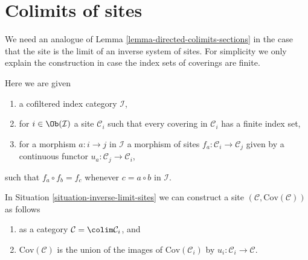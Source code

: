 \section{Colimits of sites}
\label{section-colimit-sites}

\noindent
We need an analogue of Lemma \ref{lemma-directed-colimits-sections}
in the case that the site
is the limit of an inverse system of sites. For simplicity we only
explain the construction in case the index sets of coverings are finite.

\begin{situation}
\label{situation-inverse-limit-sites}
Here we are given
\begin{enumerate}
\item a cofiltered index category $\mathcal{I}$,
\item for $i \in \Ob(\mathcal{I})$ a site $\mathcal{C}_i$ such that every
covering in $\mathcal{C}_i$ has a finite index set,
\item for a morphism $a : i \to j$ in $\mathcal{I}$ a morphism of sites
$f_a : \mathcal{C}_i \to \mathcal{C}_j$ given by a continuous functor
$u_a : \mathcal{C}_j \to \mathcal{C}_i$,
\end{enumerate}
such that $f_a \circ f_b = f_c$ whenever $c = a \circ b$ in $\mathcal{I}$.
\end{situation}

\begin{lemma}
\label{lemma-colimit-sites}
In Situation \ref{situation-inverse-limit-sites} we can construct
a site $(\mathcal{C}, \text{Cov}(\mathcal{C}))$ as follows
\begin{enumerate}
\item as a category $\mathcal{C} = \colim \mathcal{C}_i$, and
\item $\text{Cov}(\mathcal{C})$ is the union of the images
of $\text{Cov}(\mathcal{C}_i)$ by $u_i : \mathcal{C}_i \to \mathcal{C}$.
\end{enumerate}
\end{lemma}

